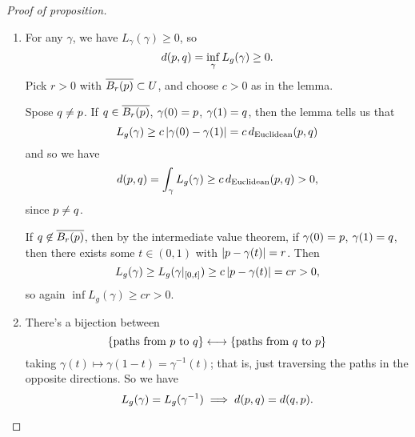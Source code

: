 \begin{proof} [Proof of proposition]
\mbox{}
\begin{enumerate}
	\item For any $\gamma$, we have $L_\gamma(\gamma) \geq 0$, so
	\begin{equation*}
		d(p,q) = \inf_\gamma {L_g(\gamma)} \geq 0.
	\end{equation*}
	Pick $r>0$ with $\overline{B_r(p)} \subset U$, and choose $c>0$ as in the lemma.

	Spose $q \neq p$. If $q\in\overline{B_r(p)}$, $\gamma(0)=p$, $\gamma(1)=q$, then the lemma tells us that
	\begin{equation*}
		L_g(\gamma)
		\geq c \left\vert \gamma(0)-\gamma(1) \right\vert
		= c\,d_\text{Euclidean}(p,q)
	\end{equation*}
	and so we have
	\begin{equation*}
		d(p,q) = \int_\gamma {L_g(\gamma)} \geq c\,d_\text{Euclidean}(p,q) > 0,
	\end{equation*}
	since $p \neq q$.

	If $q\not\in \overline{B_r(p)}$, then by the intermediate value theorem, if $\gamma(0)=p$, $\gamma(1)=q$, then there exists some $t\in(0,1)$ with $\left\vert p-\gamma(t) \right\vert=r$. Then
	\begin{equation*}
		L_g(\gamma) \geq L_g(\gamma|_{[0,t]}) \geq c\left\vert p-\gamma(t) \right\vert = cr > 0,
	\end{equation*}
	so again $\inf L_g(\gamma) \geq cr > 0$.

	\item There's a bijection between
	\begin{equation*}
		\left\{ \text{paths from $p$ to $q$} \right\} \longleftrightarrow \left\{ \text{paths from $q$ to $p$} \right\}
	\end{equation*}
	taking $\gamma(t) \mapsto \gamma(1-t) = \gamma^{-1}(t)$; that is, just traversing the paths in the opposite directions. So we have
	\begin{equation*}
		L_g(\gamma) = L_g(\gamma^{-1}) \implies d(p,q) = d(q,p).
	\end{equation*}

		\pagebreak


\end{enumerate}
\end{proof}
